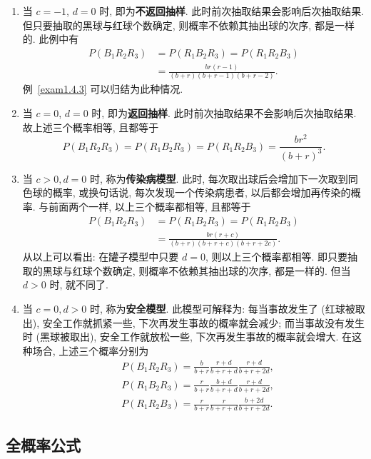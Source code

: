 \begin{enumerate}
  \item 当 $c=-1$, $d=0$ 时,
  即为\textbf{不返回抽样}.
  此时前次抽取结果会影响后次抽取结果.
  但只要抽取的黑球与红球个数确定,
  则概率不依赖其抽出球的次序,
  都是一样的.
  此例中有
  \begin{align*}
    P(B_1 R_2 R_3) &= P(R_1 B_2 R_3) = P(R_1 R_2 B_3)\\
    &= \frac{br(r-1)}{(b+r) (b+r-1) (b+r-2)}.
  \end{align*}
  例~\ref{exam1.4.3} 可以归结为此种情况.

  \item 当 $c=0$, $d=0$ 时,
  即为\textbf{返回抽样}.
  此时前次抽取结果不会影响后次抽取结果.
  故上述三个概率相等,
  且都等于
  \[
    P(B_1 R_2 R_3) = P(R_1 B_2 R_3) = P(R_1 R_2 B_3) = \frac{br^2}{(b+r)^3}.
  \]

  \item 当 $c>0, d=0$ 时,
  称为\textbf{传染病模型}.
  此时,
  每次取出球后会增加下一次取到同色球的概率,
  或换句话说,
  每次发现一个传染病患者,
  以后都会增加再传染的概率.
  与前面两个一样,
  以上三个概率都相等,
  且都等于
  \begin{align*}
    P(B_1 R_2 R_3) &= P(R_1 B_2 R_3) = P(R_1 R_2 B_3)\\
    &= \frac{br(r+c)}{(b+r)(b+r+c)(b+r+2c)}.
  \end{align*}
  从以上可以看出:
  在罐子模型中只要 $d=0$,
  则以上三个概率都相等.
  即只要抽取的黑球与红球个数确定,
  则概率不依赖其抽出球的次序,
  都是一样的.
  但当 $d>0$ 时,
  就不同了.

  \item 当 $c=0, d>0$ 时,
  称为\textbf{安全模型}.
  此模型可解释为:
  每当事故发生了 (红球被取出),
  安全工作就抓紧一些,
  下次再发生事故的概率就会减少;
  而当事故没有发生时 (黑球被取出),
  安全工作就放松一些,
  下次再发生事故的概率就会增大.
  在这种场合,
  上述三个概率分别为
  \begin{align*}
    & P(B_1 R_2 R_3) = \frac{b}{b+r} \frac{r+d}{b+r+d} \frac{r+d}{b+r+2d},\\
    & P(R_1 B_2 R_3) = \frac{r}{b+r} \frac{b+d}{b+r+d} \frac{r+d}{b+r+2d},\\
    & P(R_1 R_2 B_3) = \frac{r}{b+r} \frac{r}{b+r+d} \frac{b+2d}{b+r+2d}.
  \end{align*}
\end{enumerate}

\subsection{全概率公式}

